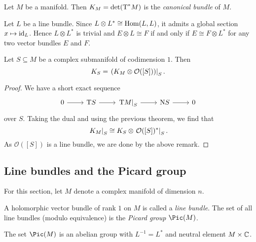 \begin{definicija}
Let $M$ be a manifold. Then $K_M = \det(\operatorname{T}^*\! M)$ is the
\emph{canonical bundle} of $M$.
\end{definicija}

\begin{opomba}
Let $L$ be a line bundle. Since $L \otimes L^* \cong \operatorname{Hom}(L, L)$,
it admits a global section $x \mapsto \operatorname{id}_L$. Hence $L \otimes L^*$
is trivial and $E \otimes L \cong F$ if and only if
$E \cong F \otimes L^*$ for any two vector bundles $E$ and $F$.
\end{opomba}

\begin{izrek}
Let $S \subseteq M$ be a complex submanifold of codimension $1$.
Then
\[
K_S = \left. \left(K_M \otimes \mathcal{O}([S])\right)\right|_{S}^{}.
\]
\end{izrek}

\begin{proof}
We have a short exact sequence
\[
\begin{tikzcd}
0 \arrow[r] &
\Tang \! S \arrow[r] &
\eval{\Tang \! M}{S}{} \arrow[r] &
\operatorname{N} \! S \arrow[r] &
0
\end{tikzcd}
\]
over $S$. Taking the dual and using the previous theorem, we find
that
\[
\left. K_M\right|_{S}^{} \cong K_S \otimes \left. \mathcal{O}([S])^*\right|_{S}^{}.
\]
As $\mathcal{O}([S])$ is a line bundle, we are done by the above
remark.
\end{proof}

\newpage

\subsection{Line bundles and the Picard group}

For this section, let $M$ denote a complex manifold of dimension
$n$.

\begin{definicija}
A holomorphic vector bundle of rank $1$ on $M$ is called a
\emph{line bundle}. The set of all line bundles
(modulo equivalence) is the \emph{Picard group}
$\Pic(M)$.
\end{definicija}

\begin{trditev}
The set $\Pic(M)$ is an abelian group with $L^{-1} = L^*$ and
neutral element $M \times \mathbb{C}$.
\end{trditev}

\obvs

